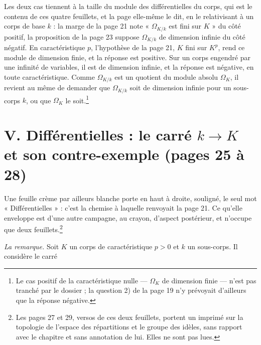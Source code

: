 \documentclass[11pt,a4paper]{article}
\begin{document}
Les deux cas tiennent à la taille du module des différentielles du corps, qui
est le contenu de ces quatre feuillets, et la page elle-même le dit, en le relativisant à un corps de base $k$ : la marge de
la page 21 note « $\Omega_{K/k}$ est fini sur $K$ » du côté positif, la
proposition de la page 23 suppose $\Omega_{K/k}$ de dimension infinie du côté
négatif. En caractéristique $p$, l'hypothèse de la page 21, $K$ fini sur
$K^p$, rend ce module de dimension finie, et la réponse est positive. Sur un
corps engendré par une infinité de variables, il est de dimension infinie, et
la réponse est négative, en toute caractéristique. Comme $\Omega_{K/k}$ est un
quotient du module absolu $\Omega_K$, il revient au même de demander que
$\Omega_{K/k}$ soit de dimension infinie pour un sous-corps $k$, ou que
$\Omega_K$ le soit.\footnote{Le cas positif de la caractéristique nulle ---
$\Omega_K$ de dimension finie --- n'est pas tranché par le dossier ; la
question 2) de la page 19 n'y prévoyait d'ailleurs que la réponse négative.}

\section*{V. Différentielles : le carré $k \to K$ et son contre-exemple (pages 25 à 28)}

Une feuille crème par ailleurs blanche porte en haut à droite, souligné, le
seul mot « Différentielles » : c'est la chemise à laquelle renvoyait la page
21. Ce qu'elle enveloppe est d'une autre campagne, au crayon, d'aspect
postérieur, et n'occupe que deux feuillets.\footnote{Les pages 27 et 29, versos
de ces deux feuillets, portent un imprimé sur la topologie de l'espace des
répartitions et le groupe des idèles, sans rapport avec le chapitre et sans
annotation de lui. Elles ne sont pas lues.}

\emph{La remarque.} Soit $K$ un corps de caractéristique $p > 0$ et $k$ un
sous-corps. Il considère le carré

\end{document}
